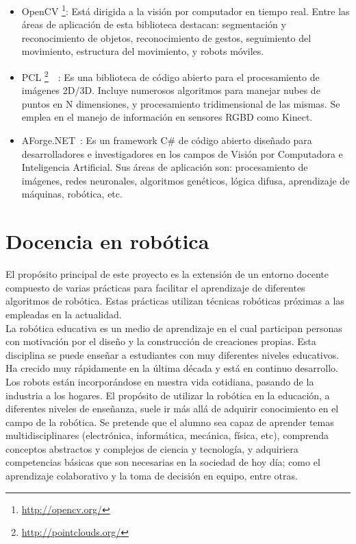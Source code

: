 \begin{itemize}
\item OpenCV \footnote{\url{http://opencv.org/}}: Está dirigida a la visión por computador en tiempo real. Entre las áreas de aplicación de esta biblioteca destacan: segmentación y reconocimiento de objetos, reconocimiento de gestos, seguimiento del movimiento, estructura del movimiento,  y robots móviles.
\item PCL \footnote{\url{http://pointclouds.org/}}~\cite{pcl}~\cite{pcl1}: Es una biblioteca de código abierto para el procesamiento de imágenes 2D/3D. Incluye numerosos algoritmos para manejar nubes  de puntos en N dimensiones, y procesamiento tridimensional de las mismas. Se emplea en el manejo de información en sensores RGBD como Kinect.
\item AForge.NET~\cite{AForge.NET}: Es un framework C\# de código abierto diseñado para desarrolladores e investigadores en los campos de Visión por Computadora e Inteligencia Artificial. Sus áreas de aplicación son: procesamiento de imágenes, redes neuronales, algoritmos genéticos, lógica difusa, aprendizaje de máquinas, robótica, etc.
\end{itemize}

\section{Docencia en robótica}
El propósito principal de este proyecto es la extensión de un entorno docente compuesto de varias prácticas para facilitar el aprendizaje de diferentes algoritmos de robótica. Estas prácticas utilizan técnicas robóticas próximas a las empleadas en la actualidad.\\

La robótica educativa es un medio de aprendizaje en el cual participan personas con motivación por el diseño y la construcción de creaciones propias. Esta disciplina se puede enseñar a estudiantes con muy diferentes niveles educativos. Ha crecido muy rápidamente en la última década y está en continuo desarrollo. Los robots están incorporándose en nuestra vida cotidiana, pasando de la industria a los hogares. El propósito de utilizar la robótica en la educación, a diferentes niveles de enseñanza, suele ir más allá de adquirir conocimiento en el campo de la robótica. Se pretende que el alumno sea capaz de aprender temas multidisciplinares (electrónica, informática, mecánica, física, etc), comprenda conceptos abstractos y complejos de ciencia y tecnología, y adquiriera competencias básicas que son necesarias en la sociedad de hoy día; como el aprendizaje colaborativo y la toma de decisión en equipo, entre otras.\\

